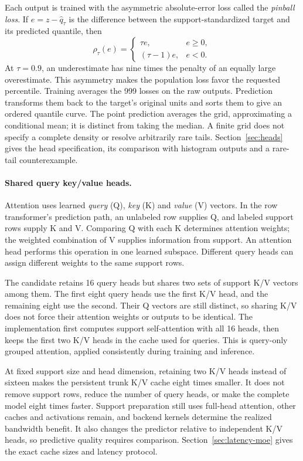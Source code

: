 \documentclass[11pt]{article}
\begin{document}
Each output is trained with the asymmetric absolute-error loss called the \emph{pinball loss}. If $e=z-\widehat q_\tau$ is the difference between the support-standardized target and its predicted quantile, then
\[
 \rho_\tau(e)=
 \begin{cases}
  \tau e,& e\geq0,\\
  (\tau-1)e,& e<0.
 \end{cases}
\]
At $\tau=0.9$, an underestimate has nine times the penalty of an equally large overestimate. This asymmetry makes the population loss favor the requested percentile. Training averages the 999 losses on the raw outputs. Prediction transforms them back to the target's original units and sorts them to give an ordered quantile curve. The point prediction averages the grid, approximating a conditional mean; it is distinct from taking the median. A finite grid does not specify a complete density or resolve arbitrarily rare tails. Section~\ref{sec:heads} gives the head specification, its comparison with histogram outputs and a rare-tail counterexample.

\paragraph{Shared query key/value heads.}
Attention uses learned \emph{query} (Q), \emph{key} (K) and \emph{value} (V) vectors. In the row transformer's prediction path, an unlabeled row supplies Q, and labeled support rows supply K and V. Comparing Q with each K determines attention weights; the weighted combination of V supplies information from support. An attention head performs this operation in one learned subspace. Different query heads can assign different weights to the same support rows.

The candidate retains 16 query heads but shares two sets of support K/V vectors among them. The first eight query heads use the first K/V head, and the remaining eight use the second. Their Q vectors are still distinct, so sharing K/V does not force their attention weights or outputs to be identical. The implementation first computes support self-attention with all 16 heads, then keeps the first two K/V heads in the cache used for queries. This is query-only grouped attention, applied consistently during training and inference.

At fixed support size and head dimension, retaining two K/V heads instead of sixteen makes the persistent trunk K/V cache eight times smaller. It does not remove support rows, reduce the number of query heads, or make the complete model eight times faster. Support preparation still uses full-head attention, other caches and activations remain, and backend kernels determine the realized bandwidth benefit. It also changes the predictor relative to independent K/V heads, so predictive quality requires comparison. Section~\ref{sec:latency-moe} gives the exact cache sizes and latency protocol.
\end{document}
